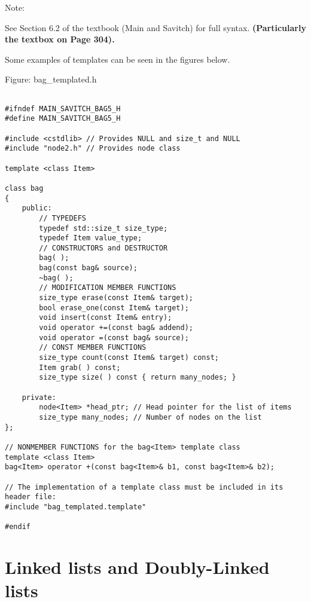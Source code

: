 \documentclass[11pt,a4paper,english]{paper}
\begin{document}
\begin{bluebox}{Note:} {

    See Section 6.2 of the textbook (Main and Savitch) for full syntax. \textbf{(Particularly the textbox on Page 304).}


}\end{bluebox}

\bigskip
\noindent Some examples of templates can be seen in the figures below.
\bigskip

\begin{bbox}{Figure: bag\_templated.h}{

  \begin{verbatim}

#ifndef MAIN_SAVITCH_BAG5_H
#define MAIN_SAVITCH_BAG5_H

#include <cstdlib> // Provides NULL and size_t and NULL
#include "node2.h" // Provides node class

template <class Item>

class bag
{
    public:
        // TYPEDEFS
        typedef std::size_t size_type;
        typedef Item value_type;
        // CONSTRUCTORS and DESTRUCTOR
        bag( );
        bag(const bag& source);
        ~bag( );
        // MODIFICATION MEMBER FUNCTIONS
        size_type erase(const Item& target);
        bool erase_one(const Item& target);
        void insert(const Item& entry);
        void operator +=(const bag& addend);
        void operator =(const bag& source);
        // CONST MEMBER FUNCTIONS
        size_type count(const Item& target) const;
        Item grab( ) const;
        size_type size( ) const { return many_nodes; }

    private:
        node<Item> *head_ptr; // Head pointer for the list of items
        size_type many_nodes; // Number of nodes on the list
};

// NONMEMBER FUNCTIONS for the bag<Item> template class
template <class Item>
bag<Item> operator +(const bag<Item>& b1, const bag<Item>& b2);

// The implementation of a template class must be included in its header file:
#include "bag_templated.template"

#endif
\end{verbatim}

}\end{bbox}

\section{Linked lists and Doubly-Linked lists}
\end{document}
